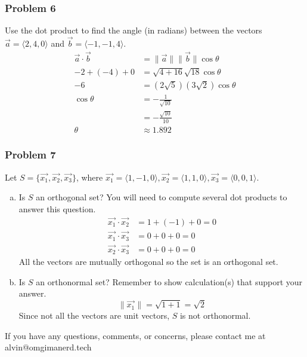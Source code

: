 \documentclass{math}
\begin{document}
\subsubsection*{Problem 6}
Use the dot product to find the angle (in radians) between the vectors
\( \vec{a} = \langle2,4,0\rangle \) and \( \vec{b} = \langle-1,-1,4\rangle \).
\begin{align*}
  \vec{a}\cdot\vec{b} &= \|\vec{a}\|\|\vec{b}\|\cos\theta \\
  -2+(-4)+0 &= \sqrt{4+16}\sqrt{18}\cos\theta \\
  -6 &= (2\sqrt{5})(3\sqrt{2})\cos\theta \\
  \cos\theta &= -\frac{1}{\sqrt{10}} \\
  &= -\frac{\sqrt{10}}{10} \\
  \theta &\approx 1.892
\end{align*}

\subsubsection*{Problem 7}
Let \( S = \{\vec{x_1},\vec{x_2},\vec{x_3}\} \), where \( \vec{x_1} =
\langle1,-1,0\rangle, \vec{x_2} = \langle1,1,0\rangle, \vec{x_3} = \langle
0,0,1\rangle \).
\begin{enumerate}[(a)]
  \item Is \( S \) an orthogonal set? You will need to compute several dot
    products to answer this question.
    \begin{align*}
      \vec{x_1}\cdot\vec{x_2} &= 1+(-1)+0 = 0 \\
      \vec{x_1}\cdot\vec{x_3} &= 0+0+0 = 0 \\
      \vec{x_2}\cdot\vec{x_3} &= 0+0+0 = 0
    \end{align*}
    All the vectors are mutually orthogonal so the set is an orthogonal set.
  \item Is \( S \) an orthonormal set? Remember to show calculation(s) that
    support your answer.
    \[ \|\vec{x_1}\| = \sqrt{1+1} = \sqrt{2} \]
    Since not all the vectors are unit vectors, \( S \) is not orthonormal.
\end{enumerate}

\begin{center}
  If you have any questions, comments, or concerns, please contact me at
  alvin@omgimanerd.tech
\end{center}
\end{document}
